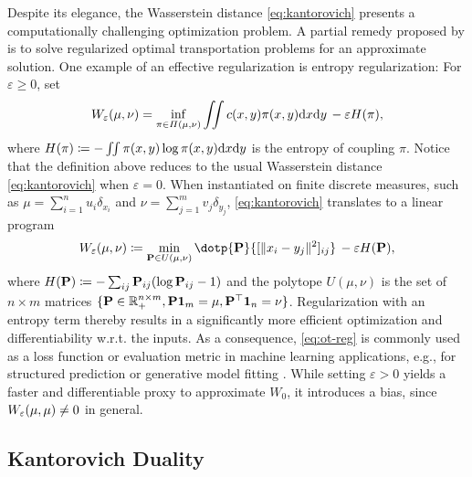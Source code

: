 Despite its elegance, the Wasserstein distance \eqref{eq:kantorovich} presents a computationally challenging optimization problem. A partial remedy proposed by \citet{cuturi2013sinkhorn} is to solve regularized optimal transportation problems for an approximate solution. One example of an effective regularization is entropy regularization: For $\varepsilon\geq0$, set 
\begin{equation} \label{eq:ot-entropy}
W_{\varepsilon}(\mu,\nu) = \inf_{\pi\in \Pi(\mu,\nu)}\iint c(x, y) \pi(x, y)\mathrm{d}x\mathrm{d}y  \,-\varepsilon H(\pi),
\end{equation}
where $H(\pi) \coloneqq - \iint \pi(x, y)\log\pi(x, y)\mathrm{d}x\mathrm{d}y$ is the entropy of coupling $\pi$. 
Notice that the definition above reduces to the usual Wasserstein distance \eqref{eq:kantorovich} when $\varepsilon=0$.
When instantiated on finite discrete measures, such as $\mu=\sum_{i=1}^n u_i\delta_{x_i}$ and $\nu=\sum_{j=1}^m v_j\delta_{y_j}$, \eqref{eq:kantorovich} translates to a linear program
\begin{equation}\label{eq:ot-reg}
\We(\mu,\nu) \defeq \min_{\bP\in U(\mu,\nu)} \dotp{\bP}{[\|x_i - y_j\|^2]_{ij}}  \,-\varepsilon H(\bP),
\end{equation}
where $H(\mathbf{P}) \coloneqq -\sum_{ij} \mathbf{P}_{ij} (\log \mathbf{P}_{ij} - 1)$ and the polytope $U(\mu,\nu)$ is the set of $n\times m$ matrices $\{\mathbf{P}\in\mathbb{R}^{n \times m}_+, \mathbf{P}\mathbf{1}_m = \mu, \mathbf{P}^\top\mathbf{1}_n=\nu\}$.
Regularization with an entropy term thereby results in a significantly more efficient optimization \citep{cuturi2013sinkhorn} and differentiability w.r.t. the inputs.
As a consequence, \ref{eq:ot-reg} is commonly used as a loss function or evaluation metric in machine learning applications, e.g., for structured prediction \citep{frogner2015learning,janati2020multi} or generative model fitting \citep{arjovsky2017wasserstein, salimans2018improving, genevay2018learning}.
While setting $\varepsilon>0$ yields a faster and differentiable proxy to approximate $W_{0}$, it introduces a bias, since $W_{\varepsilon}(\mu,\mu)\ne 0$ in general.

\subsection{Kantorovich Duality} \label{sec:background_dual}

